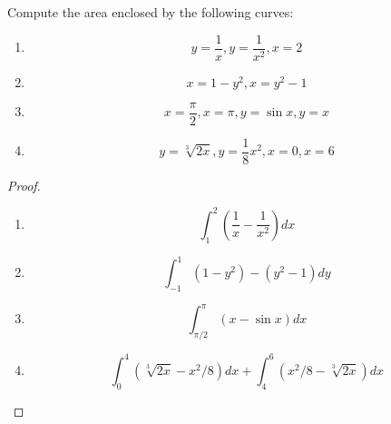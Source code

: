 \documentclass[openany]{book}
\begin{document}
\begin{prob}
    Compute the area enclosed by the following curves:
    \begin{enumerate}
        \item \begin{equation*}
            y=\frac{1}{x}, y=\frac{1}{x^2}, x=2
        \end{equation*}
        \item \begin{equation*}
            x=1-y^2, x=y^2-1
        \end{equation*}
        \item \begin{equation*}
            x=\frac{\pi}{2}, x=\pi, y=\sin x, y=x
        \end{equation*}
        \item \begin{equation*}
            y=\sqrt[3]{2x}, y=\frac{1}{8}x^2, x=0, x=6
        \end{equation*}
    \end{enumerate}
\end{prob}
\begin{proof}
    \begin{enumerate}
        \item \begin{equation*}
            \int_1^2\left(\frac{1}{x}-\frac{1}{x^2}\right)dx
        \end{equation*}
        \item \begin{equation*}
            \int_{-1}^1(1-y^2)-(y^2-1)dy
        \end{equation*}
        \item \begin{equation*}
            \int_{\pi/2}^\pi\left(x-\sin x\right)dx
        \end{equation*}
        \item \begin{equation*}
            \int_0^4\left(\sqrt[3]{2x}-x^2/8\right)dx+\int_4^6\left(x^2/8-\sqrt[3]{2x}\right)dx
        \end{equation*}
    \end{enumerate}
\end{proof}
\end{document}
